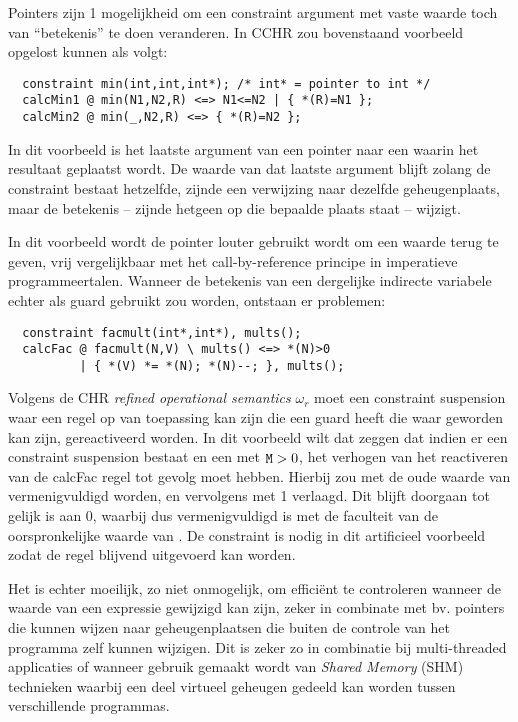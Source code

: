 Pointers zijn 1 mogelijkheid om een constraint argument met vaste waarde toch van ``betekenis'' te doen veranderen. In CCHR zou bovenstaand voorbeeld opgelost kunnen als volgt: \begin{Verbatim}
  constraint min(int,int,int*); /* int* = pointer to int */
  calcMin1 @ min(N1,N2,R) <=> N1<=N2 | { *(R)=N1 };
  calcMin2 @ min(_,N2,R) <=> { *(R)=N2 };
\end{Verbatim}

In dit voorbeeld is het laatste argument van  een pointer naar een  waarin het resultaat geplaatst wordt. De waarde van dat laatste argument blijft zolang de constraint bestaat hetzelfde, zijnde een verwijzing naar dezelfde geheugenplaats, maar de betekenis -- zijnde hetgeen op die bepaalde plaats staat -- wijzigt.

In dit voorbeeld wordt de pointer louter gebruikt wordt om een waarde terug te geven, vrij vergelijkbaar met het call-by-reference principe in imperatieve programmeertalen. Wanneer de betekenis van een dergelijke indirecte variabele echter als guard gebruikt zou worden, ontstaan er problemen: \begin{Verbatim}
  constraint facmult(int*,int*), mults();
  calcFac @ facmult(N,V) \ mults() <=> *(N)>0 
          | { *(V) *= *(N); *(N)--; }, mults();
\end{Verbatim}

Volgens de CHR {\em refined operational semantics} $\omega_r$ moet een constraint suspension waar een regel op van toepassing kan zijn die een guard heeft die waar geworden kan zijn, gereactiveerd worden. In dit voorbeeld wilt dat zeggen dat indien er een  constraint suspension bestaat en een  met ${\tt M} > 0$, het verhogen van  het reactiveren van de calcFac regel tot gevolg moet hebben. Hierbij zou  met de oude waarde van  vermenigvuldigd worden, en  vervolgens met 1 verlaagd. Dit blijft doorgaan tot  gelijk is aan $0$, waarbij  dus vermenigvuldigd is met de faculteit van de oorspronkelijke waarde van . De  constraint is nodig in dit artificieel voorbeeld zodat de  regel blijvend uitgevoerd kan worden.

Het is echter moeilijk, zo niet onmogelijk, om effici\"ent te controleren wanneer de waarde van een expressie gewijzigd kan zijn, zeker in combinate met bv. pointers die kunnen wijzen naar geheugenplaatsen die buiten de controle van het programma zelf kunnen wijzigen. Dit is zeker zo in combinatie bij multi-threaded applicaties of wanneer gebruik gemaakt wordt van {\em Shared Memory} (SHM) technieken waarbij een deel virtueel geheugen gedeeld kan worden tussen verschillende programmas.

